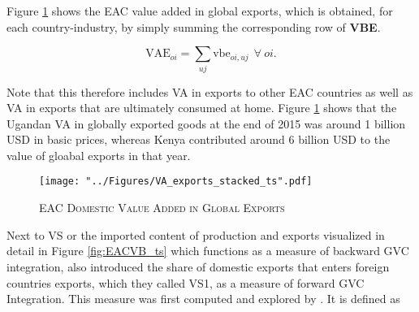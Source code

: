 \documentclass[a4paper]{article}
\begin{document}


Figure \ref{fig:VAexp} shows the EAC value added in global exports, which is obtained, for each country-industry, by simply summing the corresponding row of \textbf{VBE}.

\begin{equation} \label{eq:VAE}
\text{VAE}_{oi} = \sum_{uj} \text{vbe}_{oi, uj}\ \ \forall\ oi.
\end{equation}

 Note that this therefore includes VA in exports to other EAC countries as well as VA in exports that are ultimately consumed at home. Figure \ref{fig:VAexp} shows that the Ugandan VA in globally exported goods at the end of 2015 was around 1 billion USD in basic prices, whereas Kenya contributed around 6 billion USD to the value of gloabal exports in that year. 


\begin{figure}[h!]
\centering
\caption{\label{fig:VAexp}\textsc{EAC Domestic Value Added in Global Exports}}
\texttt{[image: "../Figures/VA\_exports\_stacked\_ts".pdf]} %
\end{figure}
\FloatBarrier

Next to VS or the imported content of production and exports visualized in detail in Figure \ref{fig:EACVB_ts} which functions as a measure of backward GVC integration, \citet{hummels2001nature} also introduced the share of domestic exports that enters foreign countries exports, which they called VS1, as a measure of forward GVC Integration. This measure was first computed and explored by \citet{daudin2011produces}. It is defined as 
\end{document}
